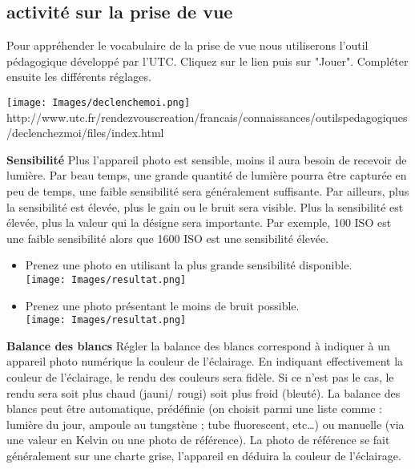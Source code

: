 \documentclass[10pt,fleqn]{article} %
\begin{document}
\subsection{activité sur la prise de vue}
Pour appréhender le vocabulaire de la prise de vue nous utiliserons l'outil pédagogique développé par l'UTC. Cliquez sur le lien puis sur "Jouer". Compléter ensuite les différents réglages.

\texttt{[image: Images/declenchemoi.png]}
\\
http://www.utc.fr/rendezvouscreation/francais/connaissances/outilspedagogiques/declenchezmoi/files/index.html

\begin{defi}
\textbf{Sensibilité}
Plus l’appareil photo est sensible, moins il aura besoin de recevoir de lumière. Par beau temps, une grande quantité de lumière pourra être capturée en peu de temps, une faible sensibilité sera généralement suffisante. Par ailleurs, plus la sensibilité est élevée, plus le gain ou le bruit sera visible. Plus la sensibilité est élevée, plus la valeur qui la désigne sera importante. Par exemple, 100 ISO est une faible sensibilité alors que 1600 ISO est une sensibilité élevée.
\end{defi}




\begin{itemize}
\item Prenez une photo en utilisant la plus grande sensibilité disponible.
\\ \texttt{[image: Images/resultat.png]}
\item Prenez une photo présentant le moins de bruit possible.
\\ \texttt{[image: Images/resultat.png]}
\end{itemize}


\begin{defi}
\textbf{Balance des blancs }
Régler la balance des blancs correspond à indiquer à un appareil photo numérique la couleur de l’éclairage. En indiquant effectivement la couleur de l’éclairage, le rendu des couleurs sera fidèle. Si ce n’est pas le cas, le rendu sera soit plus chaud (jauni/ rougi) soit plus froid (bleuté).
La balance des blancs peut être automatique, prédéfinie (on choisit parmi une liste comme : lumière du jour, ampoule au tungstène ; tube fluorescent, etc…) ou manuelle (via une valeur en Kelvin ou une photo de référence). La photo de référence se fait généralement sur une charte grise, l’appareil en déduira la couleur de l’éclairage.
\end{defi}
\end{document}

